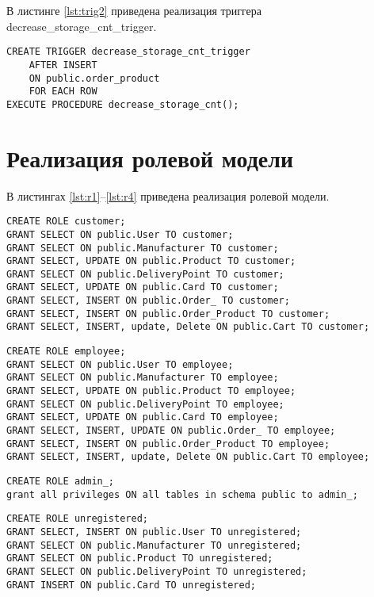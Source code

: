 \clearpage
В листинге \ref{lst:trig2} приведена реализация триггера decrease\_storage\_cnt\_trigger.
\begin{lstlisting}[label=lst:trig2,caption=Создание триггера decrease\_storage\_cnt\_trigger]
CREATE TRIGGER decrease_storage_cnt_trigger
	AFTER INSERT
	ON public.order_product
	FOR EACH ROW
EXECUTE PROCEDURE decrease_storage_cnt();
\end{lstlisting}

\section{Реализация ролевой модели}
В листингах \ref{lst:r1}--\ref{lst:r4} приведена реализация ролевой модели.
\begin{lstlisting}[label=lst:r1,caption=Реализация роли заказчика]
CREATE ROLE customer;
GRANT SELECT ON public.User TO customer;
GRANT SELECT ON public.Manufacturer TO customer;
GRANT SELECT, UPDATE ON public.Product TO customer;
GRANT SELECT ON public.DeliveryPoint TO customer;
GRANT SELECT, UPDATE ON public.Card TO customer;
GRANT SELECT, INSERT ON public.Order_ TO customer;
GRANT SELECT, INSERT ON public.Order_Product TO customer;
GRANT SELECT, INSERT, update, Delete ON public.Cart TO customer;
\end{lstlisting}

\begin{lstlisting}[label=lst:r2,caption=Реализация роли сотрудника]
CREATE ROLE employee;
GRANT SELECT ON public.User TO employee;
GRANT SELECT ON public.Manufacturer TO employee;
GRANT SELECT, UPDATE ON public.Product TO employee;
GRANT SELECT ON public.DeliveryPoint TO employee;
GRANT SELECT, UPDATE ON public.Card TO employee;
GRANT SELECT, INSERT, UPDATE ON public.Order_ TO employee;
GRANT SELECT, INSERT ON public.Order_Product TO employee;
GRANT SELECT, INSERT, update, Delete ON public.Cart TO employee;
\end{lstlisting}

\begin{lstlisting}[label=lst:r3,caption=Реализация роли администратора]
CREATE ROLE admin_;
grant all privileges ON all tables in schema public to admin_;
\end{lstlisting}

\clearpage
\begin{lstlisting}[label=lst:r4,caption=Реализация роли незарегистрированного пользователя]
CREATE ROLE unregistered;
GRANT SELECT, INSERT ON public.User TO unregistered;
GRANT SELECT ON public.Manufacturer TO unregistered;
GRANT SELECT ON public.Product TO unregistered;
GRANT SELECT ON public.DeliveryPoint TO unregistered;
GRANT INSERT ON public.Card TO unregistered;
\end{lstlisting}

